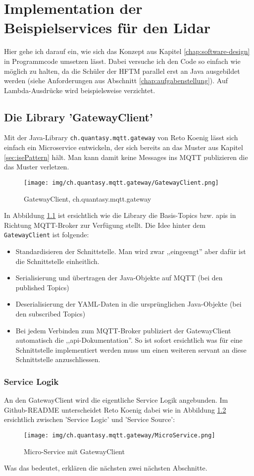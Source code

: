 \chapter{Implementation der Beispielservices für den Lidar}
Hier gehe ich darauf ein, wie sich das Konzept aus Kapitel \ref{chap:software-design} in Programmcode umsetzen lässt. Dabei versuche ich den Code so einfach wie möglich zu halten, da die Schüler der HFTM parallel erst an Java ausgebildet werden (siehe Anforderungen aus Abschnitt \ref{chap:aufgabenstellung}). Auf Lambda-Ausdrücke wird beispielsweise verzichtet.
\label{chap:beispielimplementation}
\section{Die Library 'GatewayClient'}
Mit der  Java-Library \verb|ch.quantasy.mqtt.gateway| von Reto Koenig\cite{ch.quantasy.mqtt.gateway} lässt sich einfach ein Microservice entwickeln, der sich bereits an das Muster aus Kapitel \ref{sec:isePattern} hält. Man kann damit keine Messages ins MQTT publizieren die das Muster verletzen. 
\begin{figure}[H]
	\centering
	\texttt{[image: img/ch.quantasy.mqtt.gateway/GatewayClient.png]}
	\caption{GatewayClient, ch.quantasy.mqtt.gateway\cite{ch.quantasy.mqtt.gateway}}
	\label{fig:gatewayclient}
\end{figure}
In Abbildung \ref{fig:gatewayclient} ist ersichtlich wie die Library die Basis-Topics bzw. \acrshort{api}s in Richtung MQTT-Broker zur Verfügung stellt. Die Idee hinter dem \verb|GatewayClient| ist folgende:
\begin{itemize}
	\item
	Standardisieren der Schnittstelle. Man wird zwar ,,eingeengt'' aber dafür ist die Schnittstelle einheitlich.
	\item
	Serialisierung und übertragen der Java-Objekte auf MQTT (bei den published Topics)
	\item
	Deserialisierung der YAML-Daten in die ursprünglichen Java-Objekte (bei den subscribed Topics)
	\item
	Bei jedem Verbinden zum MQTT-Broker publiziert der GatewayClient automatisch die ,,\acrshort{api}-Dokumentation''. So ist sofort ersichtlich was für eine Schnittstelle implementiert werden muss um einen weiteren \Gls{servant} an diese Schnittstelle anzuschliessen.
\end{itemize}
\subsection{Service Logik}
An den GatewayClient wird die eigentliche Service Logik angebunden. Im Github-README unterscheidet Reto Koenig\cite{ch.quantasy.mqtt.gateway} dabei wie in Abbildung \ref{fig:microService} ersichtlich zwischen 'Service Logic' und 'Service Source':
\begin{figure}[H]
	\centering
	\texttt{[image: img/ch.quantasy.mqtt.gateway/MicroService.png]}
	\caption{Micro-Service mit GatewayClient \cite{ch.quantasy.mqtt.gateway}}
	\label{fig:microService}
\end{figure}
Was das bedeutet, erklären die nächsten zwei nächsten Abschnitte.

